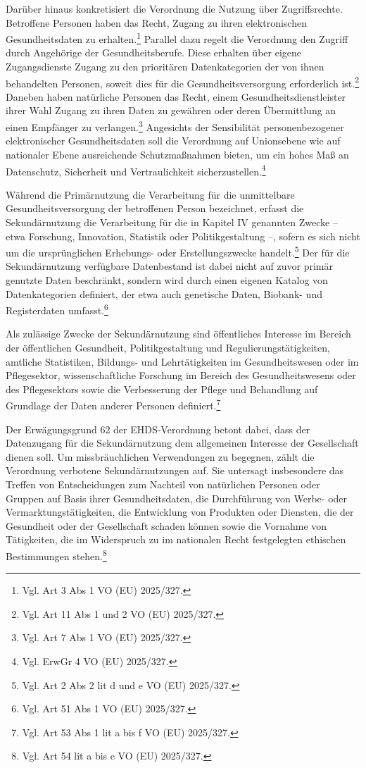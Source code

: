 Darüber hinaus konkretisiert die Verordnung die Nutzung über Zugriffsrechte. Betroffene Personen haben das Recht, Zugang zu ihren elektronischen Gesundheitsdaten zu erhalten.\footnote{Vgl. Art 3 Abs 1 VO (EU) 2025/327.} Parallel dazu regelt die Verordnung den Zugriff durch Angehörige der Gesundheitsberufe. Diese erhalten über eigene Zugangsdienste Zugang zu den prioritären Datenkategorien der von ihnen behandelten Personen, soweit dies für die Gesundheitsversorgung erforderlich ist.\footnote{Vgl. Art 11 Abs 1 und 2 VO (EU) 2025/327.} Daneben haben natürliche Personen das Recht, einem Gesundheitsdienstleister ihrer Wahl Zugang zu ihren Daten zu gewähren oder deren Übermittlung an einen Empfänger zu verlangen.\footnote{Vgl. Art 7 Abs 1 VO (EU) 2025/327.}
Angesichts der Sensibilität personenbezogener elektronischer Gesundheitsdaten soll die Verordnung auf Unionsebene wie auf nationaler Ebene ausreichende Schutzmaßnahmen bieten, um ein hohes Maß an Datenschutz, Sicherheit und Vertraulichkeit sicherzustellen.\footnote{Vgl. ErwGr 4 VO (EU) 2025/327.}

Während die Primärnutzung die Verarbeitung für die unmittelbare Gesundheitsversorgung der betroffenen Person bezeichnet, erfasst die Sekundärnutzung die Verarbeitung für die in Kapitel IV genannten Zwecke – etwa Forschung, Innovation, Statistik oder Politikgestaltung –, sofern es sich nicht um die ursprünglichen Erhebungs- oder Erstellungszwecke handelt.\footnote{Vgl. Art 2 Abs 2 lit d und e VO (EU) 2025/327.} Der für die Sekundärnutzung verfügbare Datenbestand ist dabei nicht auf zuvor primär genutzte Daten beschränkt, sondern wird durch einen eigenen Katalog von Datenkategorien definiert, der etwa auch genetische Daten, Biobank- und Registerdaten umfasst.\footnote{Vgl. Art 51 Abs 1 VO (EU) 2025/327.}

Als zulässige Zwecke der Sekundärnutzung sind öffentliches Interesse im Bereich der öffentlichen Gesundheit, Politikgestaltung und Regulierungstätigkeiten, amtliche Statistiken, Bildungs- und Lehrtätigkeiten im Gesundheitswesen oder im Pflegesektor, wissenschaftliche Forschung im Bereich des Gesundheitswesens oder des Pflegesektors sowie die Verbesserung der Pflege und Behandlung auf Grundlage der Daten anderer Personen definiert.\footnote{Vgl. Art 53 Abs 1 lit a bis f VO (EU) 2025/327.}

Der Erwägungsgrund 62 der EHDS-Verordnung betont dabei, dass der Datenzugang für die Sekundärnutzung dem allgemeinen Interesse der Gesellschaft dienen soll. Um missbräuchlichen Verwendungen zu begegnen, zählt die Verordnung verbotene Sekundärnutzungen auf. Sie untersagt insbesondere das Treffen von Entscheidungen zum Nachteil von natürlichen Personen oder Gruppen auf Basis ihrer Gesundheitsdaten, die Durchführung von Werbe- oder Vermarktungstätigkeiten, die Entwicklung von Produkten oder Diensten, die der Gesundheit oder der Gesellschaft schaden können sowie die Vornahme von Tätigkeiten, die im Widerspruch zu im nationalen Recht festgelegten ethischen Bestimmungen stehen.\footnote{Vgl. Art 54 lit a bis e VO (EU) 2025/327.}


